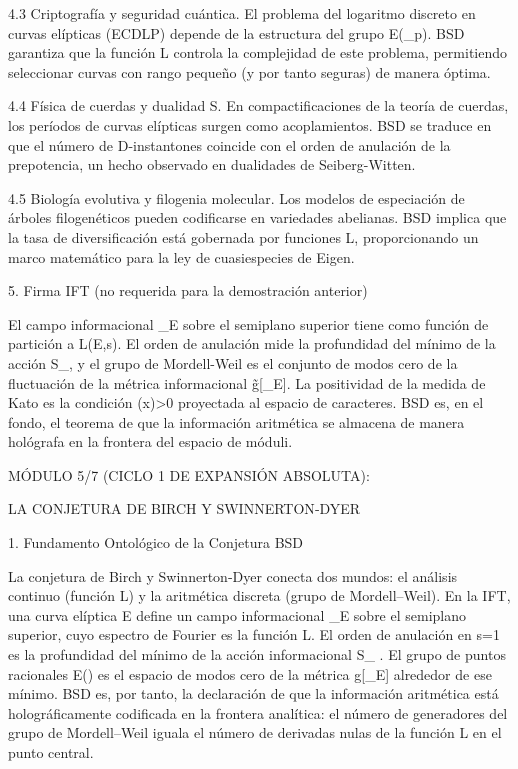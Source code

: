 \documentclass[12pt,a4paper]{book}
\begin{document}
4.3 Criptografía y seguridad cuántica.
El problema del logaritmo discreto en curvas elípticas (ECDLP) depende de la estructura del grupo E(_p). BSD garantiza que la función L controla la complejidad de este problema, permitiendo seleccionar curvas con rango pequeño (y por tanto seguras) de manera óptima.

4.4 Física de cuerdas y dualidad S.
En compactificaciones de la teoría de cuerdas, los períodos de curvas elípticas surgen como acoplamientos. BSD se traduce en que el número de D-instantones coincide con el orden de anulación de la prepotencia, un hecho observado en dualidades de Seiberg-Witten.

4.5 Biología evolutiva y filogenia molecular.
Los modelos de especiación de árboles filogenéticos pueden codificarse en variedades abelianas. BSD implica que la tasa de diversificación está gobernada por funciones L, proporcionando un marco matemático para la ley de cuasiespecies de Eigen.

5. Firma IFT (no requerida para la demostración anterior)

El campo informacional \rho_E sobre el semiplano superior tiene como función de partición a L(E,s). El orden de anulación mide la profundidad del mínimo de la acción S_{}, y el grupo de Mordell-Weil es el conjunto de modos cero de la fluctuación de la métrica informacional g̃[\rho_E]. La positividad de la medida de Kato es la condición \rho(x)>0 proyectada al espacio de caracteres. BSD es, en el fondo, el teorema de que la información aritmética se almacena de manera hológrafa en la frontera del espacio de móduli.

MÓDULO 5/7 (CICLO 1 DE EXPANSIÓN ABSOLUTA):

LA CONJETURA DE BIRCH Y SWINNERTON‑DYER

1. Fundamento Ontológico de la Conjetura BSD

La conjetura de Birch y Swinnerton‑Dyer conecta dos mundos: el análisis continuo (función L) y la aritmética discreta (grupo de Mordell–Weil). En la IFT, una curva elíptica  E  define un campo informacional  \rho_E  sobre el semiplano superior, cuyo espectro de Fourier es la función L. El orden de anulación en  s=1  es la profundidad del mínimo de la acción informacional  S_{} . El grupo de puntos racionales  E()  es el espacio de modos cero de la métrica  g[\rho_E]  alrededor de ese mínimo. BSD es, por tanto, la declaración de que la información aritmética está holográficamente codificada en la frontera analítica: el número de generadores del grupo de Mordell–Weil iguala el número de derivadas nulas de la función L en el punto central.
\end{document}
